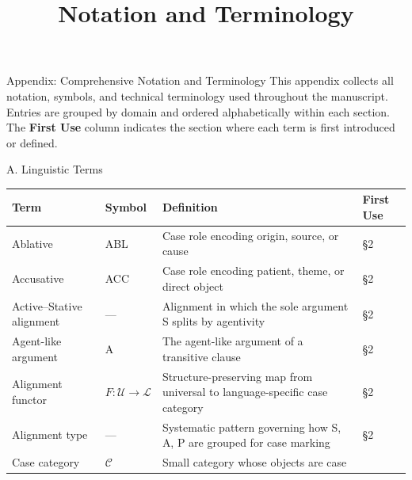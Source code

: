 \documentclass[
  ignorenonframetext,
]{beamer}
\title{\texorpdfstring{Notation and
Terminology}{Notation and Terminology}}
\author{\texorpdfstring{}{}}
\date{}
\newcounter{none} %
\begin{document}
\frame{\titlepage}

\begin{frame}[fragile]{Appendix: Comprehensive Notation and Terminology}
\protect{}\label{sec:notation}
This appendix collects all notation, symbols, and technical terminology
used throughout the manuscript. Entries are grouped by domain and
ordered alphabetically within each section. The \textbf{First Use}
column indicates the section where each term is first introduced or
defined.

\begin{block}{A. Linguistic Terms}
\protect{}\label{a.-linguistic-terms}
{\def\LTcaptype{none} %
\begin{longtable}[]{@{}
  >{\raggedright\arraybackslash}p{}
  >{\centering\arraybackslash}p{}
  >{\raggedright\arraybackslash}p{}
  >{\centering\arraybackslash}p{}@{}}
\toprule\noalign{}
\begin{minipage}[b]{\linewidth}\raggedright
Term
\end{minipage} & \begin{minipage}[b]{\linewidth}\centering
Symbol
\end{minipage} & \begin{minipage}[b]{\linewidth}\raggedright
Definition
\end{minipage} & \begin{minipage}[b]{\linewidth}\centering
First Use
\end{minipage} \\
\midrule\noalign{}
\endhead
Ablative & ABL & Case role encoding origin, source, or cause & §2 \\
Accusative & ACC & Case role encoding patient, theme, or direct object &
§2 \\
Active--Stative alignment & --- & Alignment in which the sole argument S
splits by agentivity & §2 \\
Agent-like argument & A & The agent-like argument of a transitive clause
& §2 \\
Alignment functor & \(F: \mathcal{U} \to \mathcal{L}\) &
Structure-preserving map from universal to language-specific case
category & §2 \\
Alignment type & --- & Systematic pattern governing how S, A, P are
grouped for case marking & §2 \\
Case category & \(\mathcal{C}\) & Small category whose objects are case

\end{longtable}}
\end{block}
\end{frame}
\end{document}

